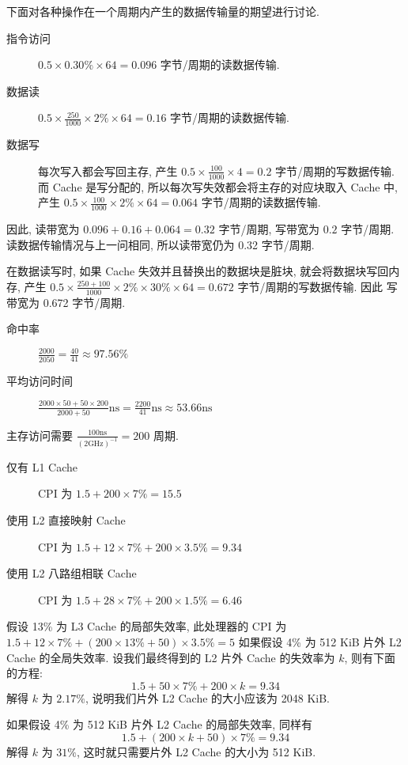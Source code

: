 \documentclass[11pt]{homework}
\begin{document}
\begin{arabicparts}
    \questionpart 下面对各种操作在一个周期内产生的数据传输量的期望进行讨论.
    \begin{description}
        \item[指令访问] $0.5\times 0.30\% \times 64 = 0.096$ 字节/周期的读数据传输.
        \item[数据读] $0.5\times \frac{250}{1000} \times 2\% \times 64 = 0.16$ 字节/周期的读数据传输.
        \item[数据写] 每次写入都会写回主存, 产生 $0.5\times \frac{100}{1000}\times 4 = 0.2$ 字节/周期的写数据传输.
            而 Cache 是写分配的, 所以每次写失效都会将主存的对应块取入 Cache 中, 产生
            $0.5\times \frac{100}{1000} \times 2\% \times 64 = 0.064$ 字节/周期的读数据传输.
    \end{description}
    因此, 读带宽为 $0.096 + 0.16 + 0.064 = 0.32$ 字节/周期, 写带宽为 $0.2$ 字节/周期.
    \questionpart 读数据传输情况与上一问相同, 所以读带宽仍为 0.32 字节/周期.

    在数据读写时, 如果 Cache 失效并且替换出的数据块是脏块, 就会将数据块写回内存, 产生
    $0.5\times\frac{250 + 100}{1000}\times 2\%\times 30\%\times 64 = 0.672$ 字节/周期的写数据传输. 因此
    写带宽为 0.672 字节/周期.
\end{arabicparts}
\question
\begin{description}
    \item[命中率] $\displaystyle \frac{2000}{2050} = \frac{40}{41} \approx 97.56\% $
    \item[平均访问时间] $\displaystyle \frac{2000 \times 50 + 50 \times 200}{2000 + 50} \mathrm{ns} = \frac{2200}{41}\mathrm{ns} \approx 53.66 \mathrm{ns}$
\end{description}
\question
\begin{arabicparts}
    \questionpart 主存访问需要 $\displaystyle \frac{100\mathrm{ns}}{(2\mathrm{GHz})^{-1}} = 200$ 周期.
    \begin{description}
        \item[仅有 L1 Cache] CPI 为 $1.5 + 200\times 7\% = 15.5$
        \item[使用 L2 直接映射 Cache] CPI 为 $1.5 + 12\times 7\% + 200 \times 3.5\% = 9.34$
        \item[使用 L2 八路组相联 Cache] CPI 为 $1.5 + 28\times 7\% + 200 \times 1.5\% = 6.46$
    \end{description}
    \questionpart 假设 13\% 为 L3 Cache 的局部失效率, 此处理器的 CPI 为 $1.5 + 12\times 7\% + (200\times 13\% + 50)\times 3.5\% = 5$
    \questionpart 如果假设 4\% 为 512 KiB 片外 L2 Cache 的全局失效率. 设我们最终得到的 L2 片外 Cache 的失效率为 $k$, 则有下面的方程:
    $$
        1.5 + 50 \times 7\% + 200 \times k = 9.34
    $$
    解得 $k$ 为 $2.17\%$, 说明我们片外 L2 Cache 的大小应该为 2048 KiB.

    如果假设 4\% 为 512 KiB 片外 L2 Cache 的局部失效率, 同样有
    $$
        1.5 + (200\times k + 50)\times 7\% = 9.34
    $$
    解得 $k$ 为 $31\%$, 这时就只需要片外 L2 Cache 的大小为 512 KiB.
\end{arabicparts}
\end{document}
